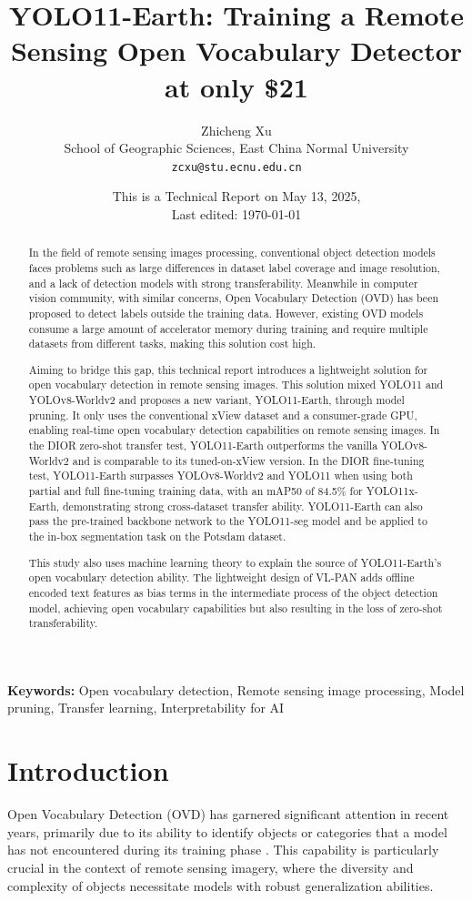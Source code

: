 \documentclass{article}
\date{This is a Technical Report on May 13, 2025, \\
    Last edited: \today}
\title{YOLO11-Earth: Training a Remote Sensing Open Vocabulary Detector at only \$21}
\author{
    Zhicheng Xu \\
    School of Geographic Sciences, East China Normal University \\
    \texttt{zcxu@stu.ecnu.edu.cn}\\
}
\begin{document}
\maketitle

\begin{abstract}
In the field of remote sensing images processing, conventional
object detection models faces problems such as large differences in dataset
label coverage and image resolution, and a lack of detection models with strong
transferability. Meanwhile in computer vision community, with similar concerns,
Open Vocabulary Detection (OVD) has been proposed to detect labels outside the training data.
However, existing OVD models consume a large amount of accelerator
memory during training and require multiple datasets from different tasks,
making this solution cost high. 

Aiming to bridge this gap, this technical report introduces a lightweight
solution for open vocabulary detection in remote sensing images. This solution
mixed YOLO11 and YOLOv8-Worldv2 and proposes a new variant,
YOLO11-Earth, through model pruning. It only uses the conventional xView
dataset and a consumer-grade GPU, enabling real-time open vocabulary detection capabilities on
remote sensing images. 
In the DIOR zero-shot transfer test, YOLO11-Earth outperforms the vanilla
YOLOv8-Worldv2 and is comparable to its tuned-on-xView version. In the DIOR
fine-tuning test, YOLO11-Earth surpasses YOLOv8-Worldv2 and YOLO11 when
using both partial and full fine-tuning training data, with an mAP50 of 84.5\%
for YOLO11x-Earth, demonstrating strong cross-dataset transfer
ability. YOLO11-Earth can also pass the pre-trained backbone network to
the YOLO11-seg model and be applied to the in-box segmentation task on the
Potsdam dataset.

This study also uses machine learning theory to explain the source of
YOLO11-Earth's open vocabulary detection ability. The lightweight design of
VL-PAN adds offline encoded text features as bias terms in the intermediate
process of the object detection model, achieving open vocabulary capabilities
but also resulting in the loss of zero-shot transferability.
\end{abstract}

\textbf{Keywords:} Open vocabulary detection, Remote sensing image processing, Model pruning, Transfer learning, Interpretability for AI
\clearpage

\section{Introduction}
Open Vocabulary Detection (OVD) has garnered significant attention in recent years, 
primarily due to its ability to identify objects or categories that a model has not 
encountered during its training phase \cite{zareian2021open, scheirer2012toward}. 
This capability is particularly crucial in the context of remote sensing imagery, 
where the diversity and complexity of objects necessitate models with robust 
generalization abilities. 
\end{document}
